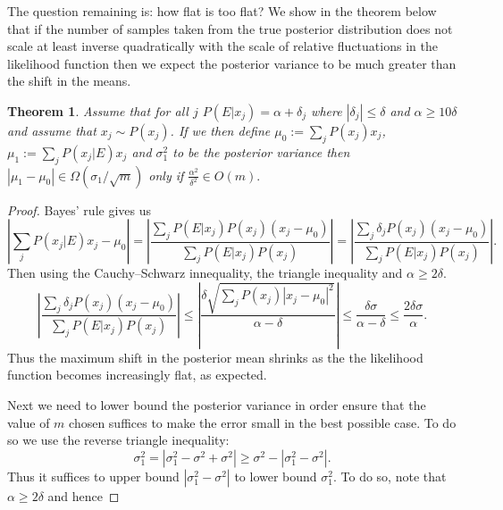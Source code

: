\documentclass[aps,pra,amsmath,twocolumn,amssymb,superscriptaddress]{revtex4-1}
\newtheorem{theorem}{Theorem}
\begin{document}
{The question remaining is: how flat is too flat?  We show in the theorem below that if the number of samples taken from the true posterior distribution does not scale at least inverse quadratically with the scale of relative fluctuations in the likelihood function then we expect the posterior variance to be much greater than the shift in the means.  
\begin{theorem}
Assume that for all $j$ $P(E|x_j) =\alpha+\delta_j$ where $|\delta_j|\le \delta$ and $\alpha \ge 10\delta$ and assume that $x_j\sim P(x_j)$.  If we then define $\mu_0 := \sum_{j} P(x_j) x_j$, $\mu_1:= \sum_j P(x_j|E) x_j$ and $\sigma_1^2$ to be the posterior variance then $|\mu_1 - \mu_0| \in \Omega(\sigma_1/\sqrt{m})$ only if
$
\frac{\alpha^2}{\delta^2}\in O(m) .
$\label{thm:stability}
\end{theorem}
\begin{proof}
Bayes' rule gives us
\begin{equation}
\left|\sum_j P(x_j|E) x_j -\mu_0\right|= \left|\frac{\sum_j P(E|x_j)P(x_j) (x_j -\mu_0)}{\sum_j P(E|x_j)P(x_j)}\right|=\left|\frac{\sum_j \delta_j P(x_j)(x_j -\mu_0)}{\sum_j P(E|x_j)P(x_j)}\right|.\label{eq:A1}
\end{equation}
Then using the Cauchy--Schwarz innequality, the triangle inequality and $\alpha\ge 2\delta$.
\begin{equation}
\left|\frac{\sum_j \delta_jP(x_j )( x_j -\mu_0)}{\sum_j P(E|x_j)P(x_j)}\right| \le \left|\frac{\delta \sqrt{\sum_j P(x_j) |x_j -\mu_0|^2}}{\alpha-\delta}\right|\le \frac{\delta  \sigma}{\alpha-\delta}\le \frac{2\delta{\sigma}}{\alpha}.\label{eq:A2}
\end{equation}
Thus the maximum shift in the posterior mean shrinks as the the likelihood function becomes increasingly flat, as expected.

Next we need to lower bound the posterior variance in order ensure that the value of $m$ chosen suffices to make the error small in the best possible case.
To do so we use the reverse triangle inequality:
\begin{equation}
\sigma_1^2 = |\sigma_1^2 -\sigma^2 +\sigma^2| \ge \sigma^2 - |\sigma_1^2-\sigma^2|.
\end{equation}
Thus it suffices to upper bound $|\sigma_1^2-\sigma^2|$ to lower bound $\sigma_1^2$.  To do so, note that $\alpha \ge 2\delta$ and hence


\end{proof}}
\end{document}
